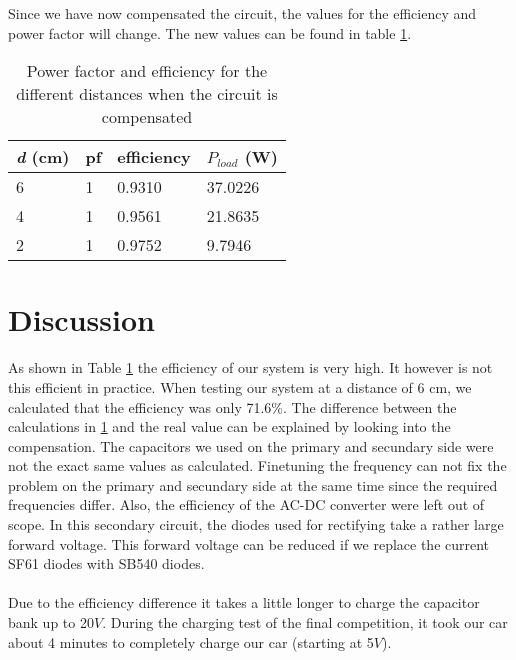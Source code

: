 \documentclass[final]{scrreprt} %
\begin{document}
Since we have now compensated the circuit, the values for the efficiency and power factor will change. 
The new values can be found in table \ref{table3}. \\

\begin{table}[h]
\begin{center}
\begin{tabular}{ l | l | l | l }
    
    \textit{d} (cm)            & pf              & efficiency  &  $P_{load}$ (W)\\	\hline
    6                           & 1                     & 0.9310                & 37.0226  \\
    4                           &1                  & 0.9561                     & 21.8635\\
    2                           & 1                   & 0.9752                    &  9.7946 \\
\end{tabular}
\caption{Power factor and efficiency for the different distances when the circuit is compensated}
\label{table3}
\end{center}
\end{table}


\section*{Discussion}

As shown in Table \ref{table3} the efficiency of our system is very high. 
It however is not this efficient in practice.
When testing our system at a distance of 6 cm, we calculated that the efficiency was only 71.6\%.
The difference between the calculations in \ref{table3} and the real value can be explained by looking into the compensation. 
The capacitors we used on the primary and secundary side were not the exact same values as calculated.
Finetuning the frequency can not fix the problem on the primary and secundary side at the same time since the required frequencies differ. 
Also, the efficiency of the AC-DC converter were left out of scope.
In this secondary circuit, the diodes used for rectifying take a rather large forward voltage.
This forward voltage can be reduced if we replace the current SF61 diodes with SB540 diodes.
\\ \\
Due to the efficiency difference it takes a little longer to charge the capacitor bank up to 20$V$.
During the charging test of the final competition, it took our car about 4 minutes to completely charge our car (starting at 5$V$). %
\end{document}
